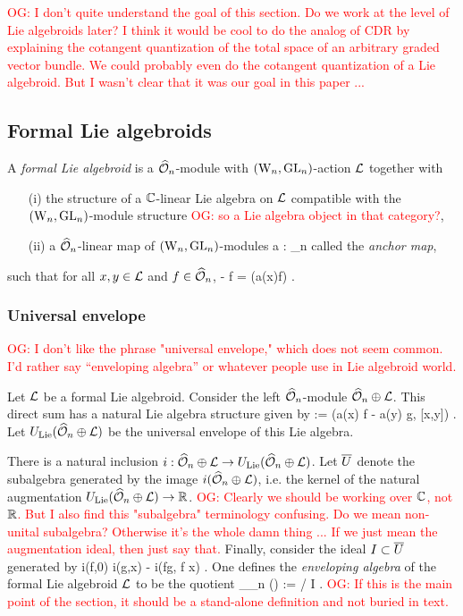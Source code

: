 \documentclass[10pt]{amsart}
\def\owen{\textcolor{red}{OG: }\textcolor{red}}
\def\cU{\mathcal{U}}
\begin{document}
\owen{I don't quite understand the goal of this section. Do we work at the level of Lie algebroids later? I think it would be cool to do the analog of CDR by explaining the cotangent quantization of the total space of an arbitrary graded vector bundle. We could probably even do the cotangent quantization of a Lie algebroid. But I wasn't clear that it was our goal in this paper ...}

\subsection{Formal Lie algebroids}

\begin{dfn} A {\it formal Lie algebroid} is a $\hO_n$-module with $(\Vect, \GL_n)$-action
  $\cL$ together with 
\begin{itemize}
\item[(i)] the structure of a $\CC$-linear Lie algebra on $\cL$
  compatible with the $(\Vect, \GL_n)$-module structure 
  \owen{so a Lie algebra object in that category?}, 
\item[(ii)] a $\hO_n$-linear map of $(\Vect, \GL_n)$-modules
\ben
a : \cL \to \hT_n
\een
called the {\em anchor map},
\end{itemize}
such that for all $x, y \in \cL$ and $f \in \hO_n$,
\ben
[x, f \cdot y] -  f \cdot [x,y]  = \left(a(x)\cdot f\right) .
\een
\end{dfn}

\subsubsection{Universal envelope}

\owen{I don't like the phrase "universal envelope," which does not seem common. I'd rather say ``enveloping algebra'' or whatever people use in Lie algebroid world.}

Let $\cL$ be a formal Lie algebroid. Consider the left $\hO_n$-module
$\hO_n \oplus \cL$. This direct sum has a natural Lie algebra
structure given by
\ben
[(f, x), (g,y)] := (a(x) \cdot f - a(y) \cdot g, [x,y]) .
\een 
Let $U_{\rm Lie}(\hO_n \oplus \cL)$ be the universal envelope of this
Lie algebra. 

There is a natural inclusion $i : \hO_n \oplus \cL \to U_{\rm
  Lie}(\hO_n \oplus \cL)$. Let $\Bar{U}$ denote the subalgebra generated by
the image $i(\hO_n \oplus \cL)$, i.e. the kernel of the natural
augmentation $U_{\rm Lie}(\hO_n \oplus \cL) \to \RR$. 
\owen{Clearly we should be working over $\CC$, not $\RR$. But I also find this "subalgebra" terminology confusing. Do we mean non-unital subalgebra? Otherwise it's the whole damn thing ... If we just mean the augmentation ideal, then just say that.}
Finally, consider the ideal $I\subset \Bar{U}$ generated by
\ben
i(f,0) \tensor i(g,x) - i(fg, f x)  .
\een 
One defines the {\em enveloping algebra} of the formal Lie algebroid $\cL$ to be the quotient
\ben
\cU_{\hO_n} (\cL) :=  / I .
\een 
\owen{If this is the main point of the section, it should be a stand-alone definition and not buried in text.}
\end{document}
